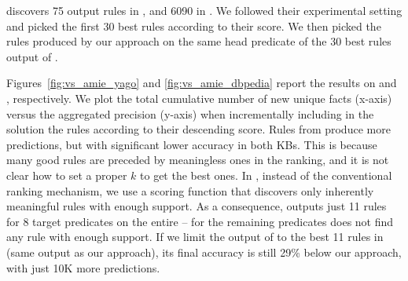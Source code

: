 \amie discovers 
75 output rules in \yago, and 6090 in \dbpedia. We followed their experimental setting and picked the first 30 best rules according to their score. We then picked the rules produced by our approach on the same head predicate of the 30 best rules output of \amie. 

Figures~\ref{fig:vs_amie_yago} and \ref{fig:vs_amie_dbpedia} report the results
on \yago and \dbpedia, respectively. 
We plot the total cumulative number of new unique facts (x-axis) versus the aggregated precision (y-axis) when incrementally including in the solution the rules according to their descending score. 
Rules from \amie produce more predictions, but with significant lower accuracy in both KBs. This is because many good rules are preceded by meaningless ones in the ranking, and it is not clear how to set a proper $k$ to get the best ones. %
In \krd, instead of the conventional ranking mechanism, we use a scoring function that discovers only inherently meaningful rules with enough support. 
%
As a consequence, \krd outputs just 11 rules for 8 target predicates on the entire \yago\@-- for the remaining predicates \krd does not find any rule with enough support. If we limit the output of \amie to the best 11 rules in \yago (same output as our approach), its final accuracy is still 29\% below our approach, with just 10K more predictions.




